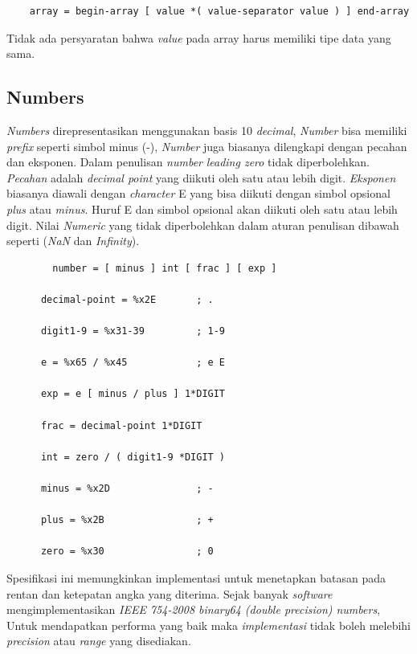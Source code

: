 \begin{lstlisting}
    array = begin-array [ value *( value-separator value ) ] end-array
\end{lstlisting}
Tidak ada persyaratan bahwa \textit{value} pada array harus memiliki tipe data yang sama.

\subsection{Numbers}
\textit{Numbers} direpresentasikan menggunakan basis 10 \textit{decimal}, \textit{Number} bisa memiliki \textit{prefix} seperti simbol minus (-), \textit{Number} juga biasanya dilengkapi dengan pecahan dan eksponen. Dalam penulisan \textit{number} \textit{leading zero} tidak diperbolehkan. \textit{Pecahan} adalah \textit{decimal point} yang diikuti oleh satu atau lebih digit. \textit{Eksponen} biasanya diawali dengan \textit{character} E yang bisa diikuti dengan simbol opsional \textit{plus} atau \textit{minus}. Huruf E dan simbol opsional akan diikuti oleh satu atau lebih digit.
Nilai \textit{Numeric} yang tidak diperbolehkan dalam aturan penulisan dibawah seperti (\textit{NaN} dan \textit{Infinity}).

\begin{lstlisting}
        number = [ minus ] int [ frac ] [ exp ]

      decimal-point = %x2E       ; .

      digit1-9 = %x31-39         ; 1-9

      e = %x65 / %x45            ; e E

      exp = e [ minus / plus ] 1*DIGIT

      frac = decimal-point 1*DIGIT

      int = zero / ( digit1-9 *DIGIT )

      minus = %x2D               ; -

      plus = %x2B                ; +

      zero = %x30                ; 0
\end{lstlisting}
Spesifikasi ini memungkinkan implementasi untuk menetapkan batasan pada rentan  dan ketepatan angka yang diterima. Sejak banyak \textit{software} mengimplementasikan \textit{ IEEE 754-2008 binary64 (double precision) numbers}, Untuk mendapatkan performa yang baik maka \textit{implementasi} tidak boleh melebihi \textit{precision} atau \textit{range} yang disediakan.


